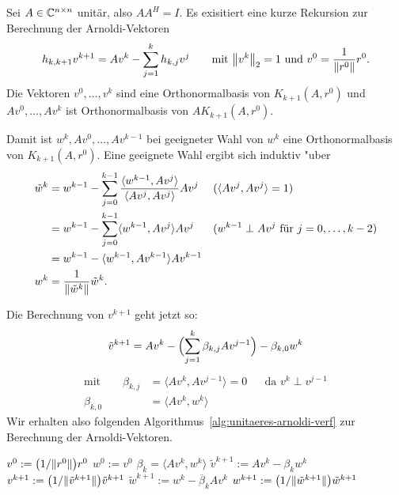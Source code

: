 \begin{bsp}
  Sei $A\in\mathbb{C}^{n\times n}$ unit\"ar, also $AA^H=I$. Es exisitiert eine kurze Rekursion
  zur Berechnung der Arnoldi-Vektoren
  \begin{equation*}
    h_{k,k+1}v^{k+1} = Av^k-\sum_{j=1}^{k}h_{k,j}v^j
    \qquad
    \text{mit }
    \norm{v^k}_2=1
    \text{ und }
    v^0=\frac{1}{\norm{r^0}}r^0.
  \end{equation*}
Die Vektoren
  $v^0,\dots,v^k$ sind eine Orthonormalbasis von $K_{k+1}(A,r^0)$ und
  {$Av^0,\dots,Av^k$} ist Orthonormalbasis von $AK_{k+1}(A,r^0)$.

  Damit ist $w^k,Av^0,\dots,Av^{k-1}$ bei geeigneter Wahl von $w^k$ eine
  Orthonormalbasis von $K_{k+1}(A,r^0)$.
  Eine geeignete Wahl ergibt sich induktiv "uber
  \begin{align*}
    \tilde w^k
    &= w^{k-1} - \sum_{j=0}^{k-1}
    \frac {\langle w^{k-1},Av^j\rangle} {\langle Av^j,Av^j\rangle} Av^j
    && (\langle Av^j,Av^j\rangle = 1)
    \\
    &= w^{k-1} - \sum_{j=0}^{k-1} \langle w^{k-1},Av^j\rangle Av^j
    && (w^{k-1}\perp Av^j \text{ f\"ur } j=0,\dots,k-2)
    \\
    &= w^{k-1} - \langle w^{k-1},Av^{k-1}\rangle Av^{k-1}
    &&
    \\
    w^k
    &= \frac{1}{\norm{\tilde w^k}}\tilde w^k
    .
    &&
  \end{align*}

  Die Berechnung von $v^{k+1}$ geht jetzt so:
  \begin{equation*}
    \tilde v^{k+1} = Av^k -\Bigl(\sum_{j=1}^{k}\beta_{k,j}Av^{j-1}\Bigr)
    - \beta_{k,0}w^k
  \end{equation*}
  \begin{align*}
    \text{mit}\qquad
    \beta_{k,j}
    &= \langle Av^k, Av^{j-1}\rangle = 0
    &&\text{da } v^k\perp v^{j-1}
    \\
    \beta_{k,0}
    &=
    \langle Av^k, w^k\rangle
    &&
  \end{align*}
  Wir erhalten also folgenden Algorithmus~\ref{alg:unitaeres-arnoldi-verf}
  zur Berechnung der Arnoldi-Vektoren.

  \begin{alg}\label{alg:unitaeres-arnoldi-verf}
    \begin{algorithm}
      \begin{algorithmic}
        \STATE $v^0 := \bigl(1/\norm[normal]{r^0}\bigr)r^0$
        \STATE $w^0 := v^0$
          \STATE $\beta_k = \langle Av^k,w^k\rangle$
          \STATE $\tilde v^{k+1} := Av^k-\beta_k w^k$
          \STATE $v^{k+1}
            :=\bigl(1/\norm[normal]{\tilde v^{k+1}}\bigr)\tilde v^{k+1}$
          \STATE $\tilde w^{k+1} := w^k-\overline{\beta}_k Av^k$
          \STATE $w^{k+1}
            :=\bigl(1/\norm[normal]{\tilde w^{k+1}}\bigr)\tilde w^{k+1}$
        \ENDFOR
      \end{algorithmic}
    \end{algorithm}
  \end{alg}


\end{bsp}

